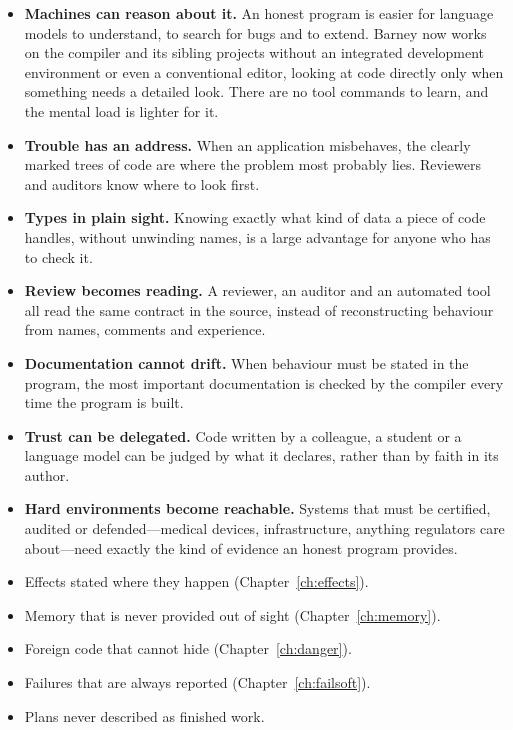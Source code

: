 \begin{itemize}
  \item \textbf{Machines can reason about it.} An honest program is easier
        for language models to understand, to search for bugs and to extend.
        Barney now works on the compiler and its sibling projects without an
        integrated development environment or even a conventional editor,
        looking at code directly only when something needs a detailed look.
        There are no tool commands to learn, and the mental load is lighter
        for it.
  \item \textbf{Trouble has an address.} When an application misbehaves,
        the clearly marked trees of  code are where the
        problem most probably lies. Reviewers and auditors know where to look
        first.
  \item \textbf{Types in plain sight.} Knowing exactly what kind of data a
        piece of code handles, without unwinding names, is a large advantage
        for anyone who has to check it.
  \item \textbf{Review becomes reading.} A reviewer, an auditor and an
        automated tool all read the same contract in the source, instead of
        reconstructing behaviour from names, comments and experience.
  \item \textbf{Documentation cannot drift.} When behaviour must be stated in
        the program, the most important documentation is checked by the
        compiler every time the program is built.
  \item \textbf{Trust can be delegated.} Code written by a colleague, a
        student or a language model can be judged by what it declares, rather
        than by faith in its author.
  \item \textbf{Hard environments become reachable.} Systems that must be
        certified, audited or defended---medical devices, infrastructure,
        anything regulators care about---need exactly the kind of evidence an
        honest program provides.
\end{itemize}


\begin{sidebox}
\begin{itemize}\itemsep0pt
  \item Effects stated where they happen (Chapter~\ref{ch:effects}).
  \item Memory that is never provided out of sight (Chapter~\ref{ch:memory}).
  \item Foreign code that cannot hide (Chapter~\ref{ch:danger}).
  \item Failures that are always reported (Chapter~\ref{ch:failsoft}).
  \item Plans never described as finished work.
\end{itemize}
\end{sidebox}
